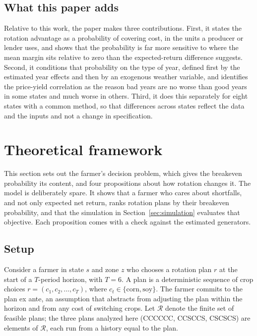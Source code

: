 \documentclass[11pt,letterpaper]{article}
\theoremstyle{remark}
\begin{document}
\subsection{What this paper adds}

Relative to this work, the paper makes three contributions. First, it states the rotation advantage as a probability of covering cost, in the units a producer or lender uses, and shows that the probability is far more sensitive to where the mean margin sits relative to zero than the expected-return difference suggests. Second, it conditions that probability on the type of year, defined first by the estimated year effects and then by an exogenous weather variable, and identifies the price-yield correlation as the reason bad years are no worse than good years in some states and much worse in others. Third, it does this separately for eight states with a common method, so that differences across states reflect the data and the inputs and not a change in specification.

\section{\label{sec:theory}Theoretical framework}

This section sets out the farmer's decision problem, which gives the breakeven probability its content, and four propositions about how rotation changes it. The model is deliberately spare. It shows that a farmer who cares about shortfalls, and not only expected net return, ranks rotation plans by their breakeven probability, and that the simulation in Section~\ref{sec:simulation} evaluates that objective. Each proposition comes with a check against the estimated generators.

\subsection{\label{subsec:setup}Setup}

Consider a farmer in state $s$ and zone $z$ who chooses a rotation plan $r$ at the start of a $T$-period horizon, with $T=6$. A plan is a deterministic sequence of crop choices $r = (c_1, c_2, \ldots, c_T)$, where $c_t \in \{\text{corn}, \text{soy}\}$. The farmer commits to the plan ex ante, an assumption that abstracts from adjusting the plan within the horizon and from any cost of switching crops. Let $\mathcal{R}$ denote the finite set of feasible plans; the three plans analyzed here (CCCCCC, CCSCCS, CSCSCS) are elements of $\mathcal{R}$, each run from a history equal to the plan.
\end{document}
